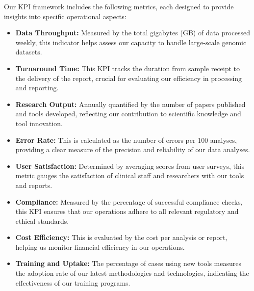 Our KPI framework includes the following metrics, each designed to provide insights into specific operational aspects:

\begin{itemize}
    \item \textbf{Data Throughput:} Measured by the total gigabytes (GB) of data processed weekly, this indicator helps assess our capacity to handle large-scale genomic datasets.
    \item \textbf{Turnaround Time:} This KPI tracks the duration from sample receipt to the delivery of the report, crucial for evaluating our efficiency in processing and reporting.
    \item \textbf{Research Output:} Annually quantified by the number of papers published and tools developed, reflecting our contribution to scientific knowledge and tool innovation.
    \item \textbf{Error Rate:} This is calculated as the number of errors per 100 analyses, providing a clear measure of the precision and reliability of our data analyses.
    \item \textbf{User Satisfaction:} Determined by averaging scores from user surveys, this metric gauges the satisfaction of clinical staff and researchers with our tools and reports.
    \item \textbf{Compliance:} Measured by the percentage of successful compliance checks, this KPI ensures that our operations adhere to all relevant regulatory and ethical standards.
    \item \textbf{Cost Efficiency:} This is evaluated by the cost per analysis or report, helping us monitor financial efficiency in our operations.
    \item \textbf{Training and Uptake:} The percentage of cases using new tools measures the adoption rate of our latest methodologies and technologies, indicating the effectiveness of our training programs.
\end{itemize}

